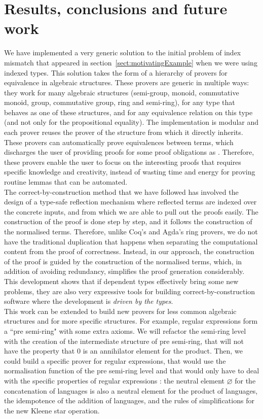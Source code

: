 \section{Results, conclusions and future work}

We have implemented a very generic solution to the initial problem of index mismatch that appeared in section~\ref{sect:motivatingExample} when we were using indexed types. This solution takes the form of a hierarchy of provers for equivalence in algebraic structures. These provers are generic in multiple ways: they work for many algebraic structures (semi-group, monoid, commutative monoid, group, commutative group, ring and semi-ring), for any type that behaves as one of these structures, and for any equivalence relation on this type (and not only for the propositional equality). The implementation is modular and each prover reuses the prover of the structure from which it directly inherits. These provers can automatically prove equivalences between terms, which discharges the user of providing proofs for some proof obligations as . Therefore, these provers enable the user to focus on the interesting proofs that requires specific knowledge and creativity, instead of wasting time and energy for proving routine lemmas that can be automated.\\

The correct-by-construction method that we have followed has involved the design of a type-safe reflection mechanism where reflected terms are indexed over the concrete inputs, and from which we are able to pull out the proofs easily. The construction of the proof is done step by step, and it follows the construction of the normalised terms. Therefore, unlike Coq's and Agda's ring provers, we do not have the traditional duplication that happens when separating the computational content from the proof of correctness. Instead, in our approach, the construction of the proof is guided by the construction of the normalised terms, which, in addition of avoiding redundancy, simplifies the proof generation considerably. This development shows that if dependent types effectively bring some new problems, they are also very expressive tools for building correct-by-construction software where the development is \emph{driven by the types}. \\

This work can be extended to build new provers for less common algebraic structures and for more specific structures. For example, regular expressions form a ``pre semi-ring" with some extra axioms. We will refactor the semi-ring level with the creation of the intermediate structure of pre semi-ring, that will not have the property that $0$ is an annihilator element for the product. Then, we could build a specific prover for regular expressions, that would use the normalisation function of the pre semi-ring level and that would only have to deal with the specific properties of regular expressions : the neutral element $\varnothing$ for the concatenation of languages is also a neutral element for the product of languages, the idempotence of the addition of languages, and the rules of simplifications for the new Kleene star operation.


